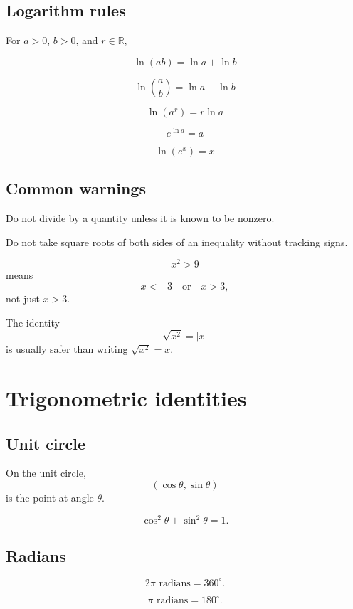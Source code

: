 \subsection*{Logarithm rules}

For \(a>0\), \(b>0\), and \(r\in\mathbb R\),

\[
\boxed{
    \ln(ab)=\ln a+\ln b
}
\]

\[
\boxed{
    \ln\left(\frac ab\right)=\ln a-\ln b
}
\]

\[
\boxed{
    \ln(a^r)=r\ln a
}
\]

\[
\boxed{
    e^{\ln a}=a
}
\]

\[
\boxed{
    \ln(e^x)=x
}
\]

\subsection*{Common warnings}

Do not divide by a quantity unless it is known to be nonzero.

Do not take square roots of both sides of an inequality without tracking signs.

\[
    x^2>9
\]
means
\[
    x<-3
    \quad\text{or}\quad
    x>3,
\]
not just \(x>3\).

The identity
\[
    \sqrt{x^2}=|x|
\]
is usually safer than writing \(\sqrt{x^2}=x\).

\section{Trigonometric identities}
\label{app:B.2}

\subsection*{Unit circle}

On the unit circle,
\[
\boxed{
    (\cos\theta,\sin\theta)
}
\]
is the point at angle \(\theta\).

\[
\boxed{
    \cos^2\theta+\sin^2\theta=1.
}
\]

\subsection*{Radians}

\[
\boxed{
    2\pi\text{ radians}=360^\circ.
}
\]

\[
\boxed{
    \pi\text{ radians}=180^\circ.
}
\]

